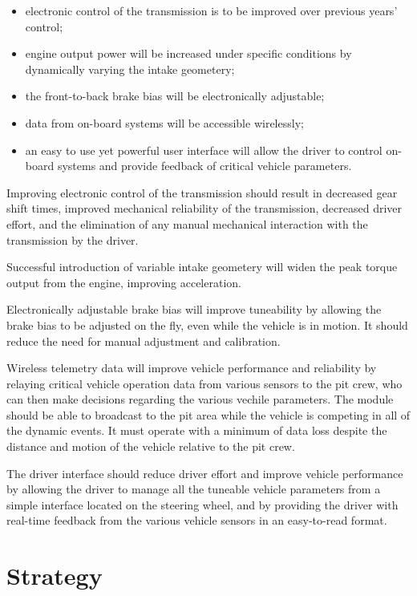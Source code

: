 \begin{itemize}
 \item electronic control of the transmission is to be improved over previous years' control;
 \item engine output power will be increased under specific conditions by dynamically varying the intake geometery;
 \item the front-to-back brake bias will be electronically adjustable;
 \item data from on-board systems will be accessible wirelessly;
 \item an easy to use yet powerful user interface will allow the driver to control on-board systems and provide feedback of critical vehicle parameters.
\end{itemize}

Improving electronic control of the transmission should result in decreased gear shift times, improved mechanical reliability of the transmission, decreased driver effort, and the elimination of any manual mechanical interaction with the transmission by the driver.

Successful introduction of variable intake geometery will widen the peak torque output from the engine, improving acceleration.

Electronically adjustable brake bias will improve tuneability by allowing the brake bias to be adjusted on the fly, even while the vehicle is in motion. It should reduce the need for manual adjustment and calibration.

Wireless telemetry data will improve vehicle performance and reliability by relaying critical vehicle operation data from various sensors to the pit crew, who can then make decisions regarding the various vechile parameters. The module should be able to broadcast to the pit area while the vehicle is competing in all of the dynamic events. It must operate with a minimum of data loss despite the distance and motion of the vehicle relative to the pit crew.

The driver interface should reduce driver effort and improve vehicle performance by allowing the driver to manage all the tuneable vehicle parameters from a simple interface located on the steering wheel, and by providing the driver with real-time feedback from the various vehicle sensors in an easy-to-read format.

\section{Strategy}

